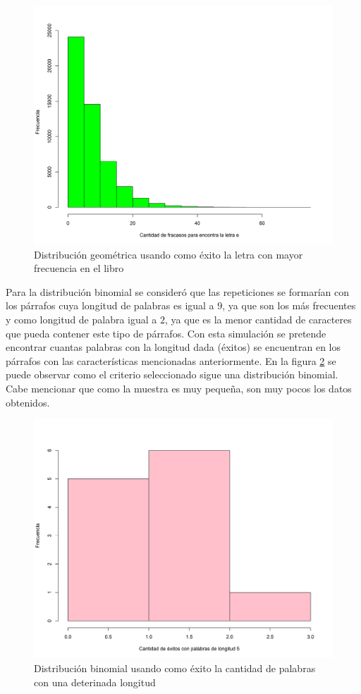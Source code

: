 \documentclass{article}
\begin{document}
\begin{figure}
\centering
\includegraphics[scale=0.5]{Figures/letraE.png}
\caption{Distribución geométrica usando como éxito la letra con mayor frecuencia en el libro}
\label{letraE}
\end{figure}

Para la distribución binomial se consideró que las repeticiones se formarían con los párrafos cuya longitud de palabras es igual a $9$, ya que son los más frecuentes y como longitud de palabra igual a $2$, ya que es la menor cantidad de caracteres que pueda contener este tipo de párrafos. Con esta simulación se pretende encontrar cuantas palabras con la longitud dada (éxitos) se encuentran en los párrafos con las características mencionadas anteriormente. En la figura \ref{cantPalabras} se puede observar como el criterio seleccionado sigue una distribución binomial. Cabe mencionar que como la muestra es muy pequeña, son muy pocos los datos obtenidos.


\begin{figure}
\centering
\includegraphics[scale=0.5]{Figures/cantPalabras.png}
\caption{Distribución binomial usando como éxito la cantidad de palabras con una deterinada longitud}
\label{cantPalabras}
\end{figure}
\end{document}
